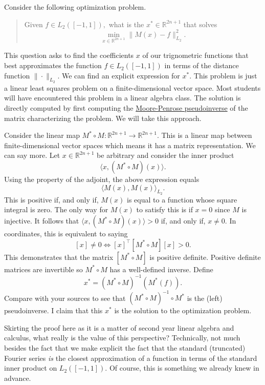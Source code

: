Consider the following optimization problem.
%
\begin{quote}
  Given \(f \in L_2([-1, 1]),\) what is the \(x^* \in \mathbb{R}^{2n+1}\) that solves
  \[
    \min_{x \in \mathbb{R}^{2n+1}} \| M(x) - f \|_{L_2}^2.
  \]
\end{quote}
%
This question asks to find the coefficients \(x\) of our trignometric functions that best approximates the function \(f \in L_2([-1, 1])\) in terms of the distance function \(\|\cdot\|_{L_2}.\)
We can find an explicit expression for \(x^*.\)
This problem is just a linear least squares problem on a finite-dimensional vector space.
Most students will have encountered this problem in a linear algebra class.
The solution is directly computed by first computing the \href{https://en.wikipedia.org/wiki/Moore%E2%80%93Penrose_inverse}{Moore-Penrose pseudoinverse} of the matrix characterizing the problem.
We will take this approach.

Consider the linear map \(M^* \circ M: \mathbb{R}^{2n+1} \to \mathbb{R}^{2n+1}.\)
This is a linear map between finite-dimensional vector spaces which means it has a matrix representation.
We can say more.
Let \(x \in \mathbb{R}^{2n+1}\) be arbitrary and consider the inner product
\[
  \langle x, (M^* \circ M)(x) \rangle.
\]
Using the property of the adjoint, the above expression equals
\[
  \langle M(x), M(x) \rangle_{L_2}.
\]
This is positive if, and only if, \(M(x)\) is equal to a function whose square integral is zero.
The only way for \(M(x)\) to satisfy this is if \(x = 0\) since \(M\) is injective.
It follows that \(\langle x, (M^* \circ M)(x) \rangle > 0\) if, and only if, \(x \neq 0.\)
In coordinates, this is equivalent to saying
\[
  [x] \neq 0 \iff [x]^\top [M^*\circ M] [x] > 0.
\]
This demonstrates that the matrix \([M^* \circ M]\) is positive definite.
Positive definite matrices are invertible so \(M^* \circ M\) has a well-defined inverse.
Define
\[
  x^* = \left(M^* \circ M\right)^{-1}\left(M^*(f)\right).
\]
Compare with your sources to see that \((M^* \circ M)^{-1} \circ M^*\) is the (left) pseudoinverse.
I claim that this \(x^*\) is the solution to the optimization problem.

Skirting the proof here as it is a matter of second year linear algebra and calculus, what really is the value of this perspective?
Technically, not much besides the fact that we make explicit the fact that the standard (truncated) Fourier series \emph{is} the closest approximation of a function in terms of the standard inner product on \(L_2([-1, 1]).\)
Of course, this is something we already knew in advance.

